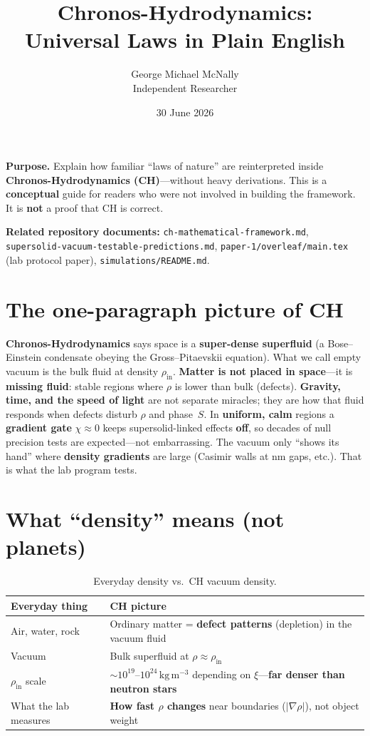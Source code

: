 \documentclass[11pt,a4paper]{article}
\title{%
  Chronos-Hydrodynamics:\\
  Universal Laws in Plain English%
}
\author{%
  George Michael McNally\\[0.25em]
  \small Independent Researcher%
}
\date{30 June 2026}
\begin{document}
\maketitle

\noindent\textbf{Purpose.}
Explain how familiar ``laws of nature'' are reinterpreted inside \textbf{Chronos-Hydrodynamics (CH)}---without heavy derivations.
This is a \textbf{conceptual} guide for readers who were not involved in building the framework.
It is \textbf{not} a proof that CH is correct.

\medskip
\noindent\textbf{Related repository documents:}
\texttt{ch-mathematical-framework.md},
\texttt{supersolid-vacuum-testable-predictions.md},
\texttt{paper-1/overleaf/main.tex} (lab protocol paper),
\texttt{simulations/README.md}.

\tableofcontents
\newpage

\section{The one-paragraph picture of CH}
\label{sec:picture}

\textbf{Chronos-Hydrodynamics} says space is a \textbf{super-dense superfluid} (a Bose--Einstein condensate obeying the Gross--Pitaevskii equation).
What we call empty vacuum is the bulk fluid at density $\rho_{\mathrm{in}}$.
\textbf{Matter is not placed in space}---it is \textbf{missing fluid}: stable regions where $\rho$ is lower than bulk (defects).
\textbf{Gravity, time, and the speed of light} are not separate miracles; they are how that fluid responds when defects disturb $\rho$ and phase~$S$.
In \textbf{uniform, calm} regions a \textbf{gradient gate} $\chi \approx 0$ keeps supersolid-linked effects \textbf{off}, so decades of null precision tests are expected---not embarrassing.
The vacuum only ``shows its hand'' where \textbf{density gradients} are large (Casimir walls at nm gaps, etc.).
That is what the lab program tests.

\section{What ``density'' means (not planets)}
\label{sec:density}

\begin{table}[htbp]
  \centering
  \small
  \caption{Everyday density vs.\ CH vacuum density.}
  \begin{tabular}{@{}ll@{}}
    \toprule
    Everyday thing & CH picture \\
    \midrule
    Air, water, rock & Ordinary matter = \textbf{defect patterns} (depletion) in the vacuum fluid \\
    Vacuum & Bulk superfluid at $\rho \approx \rho_{\mathrm{in}}$ \\
    $\rho_{\mathrm{in}}$ scale & $\sim 10^{19}$--$10^{24}\,\mathrm{kg\,m^{-3}}$ depending on $\xi$---\textbf{far denser than neutron stars} \\
    What the lab measures & \textbf{How fast $\rho$ changes} near boundaries ($|\nabla\rho|$), not object weight \\
    \bottomrule
  \end{tabular}
\end{table}
\end{document}
